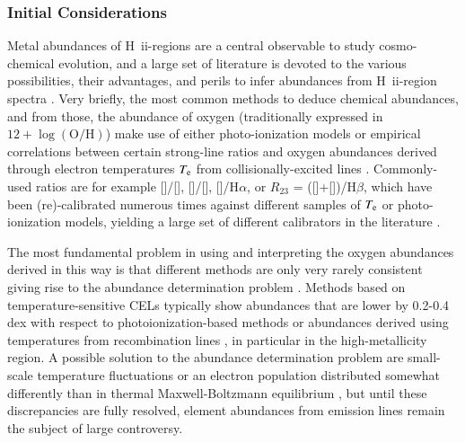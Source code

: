 \documentclass[traditabstract, referee]{aa}
\newcommand{\hb}{H$\beta$}
\newcommand{\ha}{H$\alpha$}
\newcommand{\hii}{\mbox{H~{\sc ii}}}
\newcommand{\oh}{12+\log(\mathrm{O/H})}
\newcommand{\oii}{[\ion{O}{ii}]}
\newcommand{\oiii}{[\ion{O}{iii}]}
\newcommand{\nii}{[\ion{N}{ii}]}
\begin{document}
\subsubsection{Initial Considerations}

Metal abundances of \hii-regions are a central observable to study cosmo-chemical evolution, and a large set of literature is devoted to the various possibilities, their advantages, and perils to infer abundances from \hii-region spectra \citep[e.g.][]{1979MNRAS.189...95P, 1991ApJ...380..140M, 2005ApJ...631..231P, 2008ApJ...681.1183K}. Very briefly, the most common methods to deduce chemical abundances, and from those, the abundance of oxygen (traditionally expressed in $\oh$) make use of either photo-ionization models \citep[e.g.][]{1985ApJS...58..125E, 2000ApJ...542..224D, 2002ApJS..142...35K} or empirical correlations between certain strong-line ratios and oxygen abundances derived through electron temperatures $T_{\rm{e}}$ from collisionally-excited lines \citep[CELs, e.g.][]{2004MNRAS.348L..59P, 2013A&A...559A.114M}. Commonly-used ratios are for example \nii/\oii, \oiii/\nii, \nii/\ha, or $R_{23}$ = (\oii+\oiii)/\hb, which have been (re)-calibrated numerous times against different samples of $T_{\rm{e}}$ or photo-ionization models, yielding a large set of different calibrators in the literature \citep[e.g.][]{2002ApJS..142...35K, 2004ApJ...617..240K, 2005ApJ...631..231P, 2006A&A...459...85N, 2008A&A...488..463M}.

The most fundamental problem in using and interpreting the oxygen abundances derived in this way is that different methods are only very rarely consistent \citep[e.g.][]{2008ApJ...681.1183K} giving rise to the abundance determination problem \citep{1967ApJ...150..825P}. Methods based on temperature-sensitive CELs typically show abundances that are lower by 0.2-0.4 dex with respect to photoionization-based methods or abundances derived using temperatures from recombination lines \citep[e.g.][and references therein]{2012MNRAS.426.2630L}, in particular in the high-metallicity region. A possible solution to the abundance determination problem are small-scale temperature fluctuations \citep[e.g.][]{2003ApJ...584..735P, 2004MNRAS.355..229E} or an electron population distributed somewhat differently than in thermal Maxwell-Boltzmann equilibrium \citep{2012ApJ...752..148N, 2012MNRAS.426.2630L}, but until these discrepancies are fully resolved, element abundances from emission lines remain the subject of large controversy.
\end{document}
